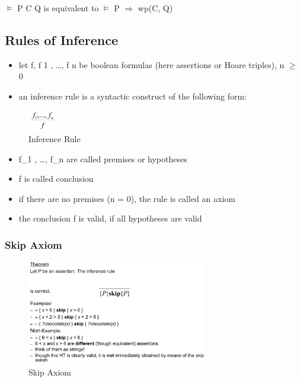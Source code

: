 \begin{tcolorbox}[colback=red!5!white,colframe=red!75!black]
$\models$ { P } C { Q } is equivalent to $\models$ P $\Rightarrow$ wp(C, Q)
\end{tcolorbox}

\hypertarget{rules-of-inference}{%
\subsection{Rules of Inference}\label{rules-of-inference}}

\begin{itemize}
\tightlist
\item
  let f, f 1 , \ldots{}, f n be boolean formulas (here assertions or
  Hoare triples), n $\geqslant$ 0
\item
  an inference rule is a syntactic construct of the following form:
\end{itemize}

\begin{figure}[H]
\centering
\includegraphics[width=50px]{figures/inferenceRule.png}
\caption{Inference Rule}
\end{figure}

\begin{itemize}
\tightlist
\item
  f\_1 , \ldots{}, f\_n are called premises or hypotheses
\item
  f is called conclusion
\item
  if there are no premises (n = 0), the rule is called an axiom
\item
  the conclusion f is valid, if all hypotheses are valid
\end{itemize}

\hypertarget{skip-axiom}{%
\subsubsection{Skip Axiom}\label{skip-axiom}}

\begin{figure}[H]
\centering
\includegraphics[width=0.7\textwidth]{figures/skipAxiom.png}
\caption{Skip Axiom}
\end{figure}

